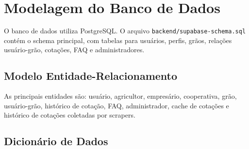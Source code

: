 \documentclass[
  12pt,
  oneside,
  a4paper,
  brazil
]{abntex2}
\begin{document}
\chapter{Modelagem do Banco de Dados}

O banco de dados utiliza PostgreSQL. O arquivo \texttt{backend/supabase-schema.sql} contém o schema principal, com tabelas para usuários, perfis, grãos, relações usuário-grão, cotações, FAQ e administradores.

\section{Modelo Entidade-Relacionamento}

As principais entidades são: usuário, agricultor, empresário, cooperativa, grão, usuário-grão, histórico de cotação, FAQ, administrador, cache de cotações e histórico de cotações coletadas por scrapers.


\section{Dicionário de Dados}
\end{document}
